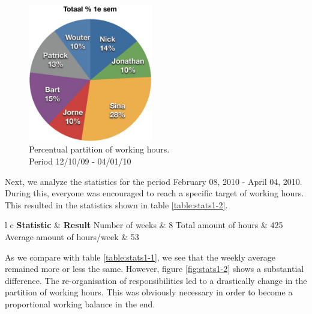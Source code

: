 \documentclass[salesmen, twoside]{../../../templates/latex/2009/softproj}
\begin{document}
\begin{projdoc}
			\begin{figure}
				\begin{center}
				\includegraphics[height=6cm]{../../img/partition-1iter-1.jpg}
				\caption{Percentual partition of working hours. \\ Period 12/10/09 - 04/01/10}
				\label{fig:stats1-1}
				\end{center}
			\end{figure}
	
			Next, we analyze the statistics for the period February 08, 2010 - April 04, 2010. During this,
			everyone was encouraged to reach a specific target of working hours. This resulted in the statistics
			shown in table \ref{table:stats1-2}. \\
			
			\begin{table}
				\begin{center}
			\begin{tabular}{l c}
				\FL \textbf{Statistic} & \textbf{Result}
				\ML Number of weeks & 8
				\NN Total amount of hours  & 425
				\NN Average amount of hours/week & 53
			\end{tabular}
			\end{center}
			\caption{General statistics for period 08/02/10 - 04/04/10.}
			\label{table:stats1-2}
			\end{table}
			
			As we compare with table \ref{table:stats1-1}, we see that the weekly average remained more or less the same.
			However, figure \ref{fig:stats1-2} shows a substantial difference.  
			The re-organisation of responsibilities led to a drastically change in the partition of working hours. 
			This was obviously necessary in order to
			become a proportional working balance in the end. \\
			

\end{projdoc}
\end{document}
